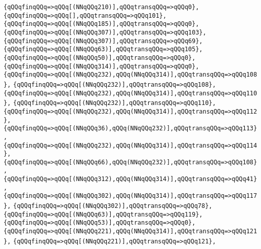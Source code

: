 \verb|{qQQqfinqQQq=>qQQq[(NNqQQq210)],qQQqtransqQQq=>qQQq0},|\newline
\verb|{qQQqfinqQQq=>qQQq[],qQQqtransqQQq=>qQQq101},|\newline
\verb|{qQQqfinqQQq=>qQQq[(NNqQQq185)],qQQqtransqQQq=>qQQq0},|\newline
\verb|{qQQqfinqQQq=>qQQq[(NNqQQq307)],qQQqtransqQQq=>qQQq103},|\newline
\verb|{qQQqfinqQQq=>qQQq[(NNqQQq307)],qQQqtransqQQq=>qQQq69},|\newline
\verb|{qQQqfinqQQq=>qQQq[(NNqQQq63)],qQQqtransqQQq=>qQQq105},|\newline
\verb|{qQQqfinqQQq=>qQQq[(NNqQQq50)],qQQqtransqQQq=>qQQq0},|\newline
\verb|{qQQqfinqQQq=>qQQq[(NNqQQq314)],qQQqtransqQQq=>qQQq0},|\newline
\verb|{qQQqfinqQQq=>qQQq[(NNqQQq232),qQQq(NNqQQq314)],qQQqtransqQQq=>qQQq108},|\newline
\verb|{qQQqfinqQQq=>qQQq[(NNqQQq232)],qQQqtransqQQq=>qQQq108},|\newline
\verb|{qQQqfinqQQq=>qQQq[(NNqQQq232),qQQq(NNqQQq314)],qQQqtransqQQq=>qQQq110},|\newline
\verb|{qQQqfinqQQq=>qQQq[(NNqQQq232)],qQQqtransqQQq=>qQQq110},|\newline
\verb|{qQQqfinqQQq=>qQQq[(NNqQQq232),qQQq(NNqQQq314)],qQQqtransqQQq=>qQQq112},|\newline
\verb|{qQQqfinqQQq=>qQQq[(NNqQQq36),qQQq(NNqQQq232)],qQQqtransqQQq=>qQQq113},|\newline
\verb|{qQQqfinqQQq=>qQQq[(NNqQQq232),qQQq(NNqQQq314)],qQQqtransqQQq=>qQQq114},|\newline
\verb|{qQQqfinqQQq=>qQQq[(NNqQQq66),qQQq(NNqQQq232)],qQQqtransqQQq=>qQQq108},|\newline
\verb|{qQQqfinqQQq=>qQQq[(NNqQQq312),qQQq(NNqQQq314)],qQQqtransqQQq=>qQQq41},|\newline
\verb|{qQQqfinqQQq=>qQQq[(NNqQQq302),qQQq(NNqQQq314)],qQQqtransqQQq=>qQQq117},|\newline
\verb|{qQQqfinqQQq=>qQQq[(NNqQQq302)],qQQqtransqQQq=>qQQq78},|\newline
\verb|{qQQqfinqQQq=>qQQq[(NNqQQq63)],qQQqtransqQQq=>qQQq119},|\newline
\verb|{qQQqfinqQQq=>qQQq[(NNqQQq53)],qQQqtransqQQq=>qQQq0},|\newline
\verb|{qQQqfinqQQq=>qQQq[(NNqQQq221),qQQq(NNqQQq314)],qQQqtransqQQq=>qQQq121},|\newline
\verb|{qQQqfinqQQq=>qQQq[(NNqQQq221)],qQQqtransqQQq=>qQQq121},|\newline

